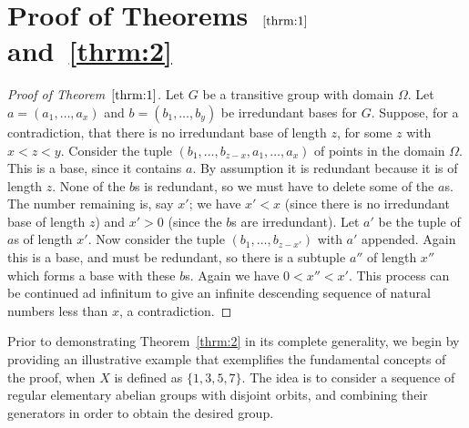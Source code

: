 \documentclass{amsart}
\begin{document}
	
	\section{Proof of Theorems~$\ref{thrm:1}$ and~\ref{thrm:2}} \label{sec1}
\begin{proof}[Proof of Theorem~$\ref{thrm:1}$]Let $G$ be a transitive group with domain $\Omega$. Let $a = (a_1 , \ldots , a_x )$ and $b = (b_1 ,\ldots , b_{y})$  be irredundant bases for $G$.
	Suppose, for a contradiction, that there is no irredundant base of length $z$,
	for some $z$ with $x < z < y$.
	Consider the tuple $(b_1, \ldots , b_{z-x} , a_1 , \ldots , a_x )$ of points in the domain $\Omega$. This is a base, since it contains $a$. By assumption it is redundant because it is of length $z$. None of the $b$s is redundant, so we
	must have to delete some of the $a$s. The number remaining is, say $x'$; we
	have $x' < x$ (since there is no irredundant base of length $z$) and $x' > 0$ (since
	the $b$s are irredundant). Let $a'$ be the tuple of $a$s of length $x'$.
	Now consider the tuple $(b_1 , \ldots , b_{z-x'} )$ with $a'$ appended. Again this is a
	base, and must be redundant, so there is a subtuple $a''$ of length $x''$ which
	forms a base with these $b$s. Again we have $0 < x'' < x'$.
	This process can be continued ad infinitum to give an infinite descending
	sequence of natural numbers less than $x$, a contradiction.
\end{proof}

	
	Prior to demonstrating Theorem~\ref{thrm:2} in its complete generality,  we begin by providing an illustrative example that exemplifies the fundamental concepts of the 
	proof, when $X$ is defined as $\{1,3,5,7\}$. The idea is to consider a sequence of regular elementary abelian groups with disjoint orbits, and combining their generators in order to obtain the desired group.
	
\end{document}
